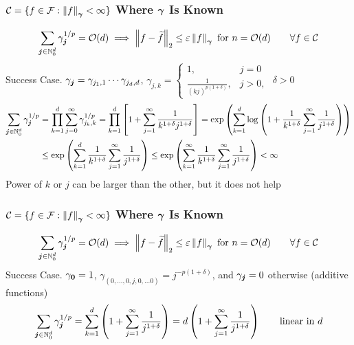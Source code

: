 \documentclass[11pt,compress,xcolor={usenames,dvipsnames},aspectratio=169]{beamer}
\begin{document}
\begin{frame}
\frametitle{$\cc = \{f \in \cf : \norm[\vgamma]{f} < \infty \}$ Where $\vgamma$ Is Known}
\vspace{-6ex}
\begin{equation*}
\sum_{\vj \in \natzero^d} \gamma_{\vj}^{1/p} = \Order(d) \implies \norm[2]{f - \tf}  \le \varepsilon \norm[\vgamma]{f} \text{ for } n = \Order(d) \qquad \forall f \in \cc
\end{equation*}
\alert{Success} Case.  $\gamma_{\vj} = \gamma_{j_1,1} \cdots \gamma_{j_d,d}$,  \quad $\gamma_{j,k} = \begin{cases}
1, & j = 0 \\
\frac{1}{(kj)^{p(1+\delta)}} , & j > 0,
\end{cases}$ \quad $\delta > 0$
\begin{align*}
\sum_{\vj \in \natzero^d} \gamma_{\vj}^{1/p} 
&= \prod_{k=1}^d \sum_{j = 0}^{\infty} \gamma_{j_k,k}^{1/p}
= \prod_{k=1}^d \left[1 + \sum_{j = 1}^{\infty} \frac{1}{k^{1+\delta}j^{1+\delta}} \right]
= \exp\left(\sum_{k=1}^d \log \left( 1 + \frac 1{k^{1+\delta}} \sum_{j=1}^\infty \frac1{j^{1+\delta}}\right) \right) \\
& \le \exp\left(\sum_{k=1}^d  \frac 1{k^{1+\delta}} \sum_{j=1}^\infty \frac1{j^{1+\delta}}\right) \le \exp\left(\sum_{k=1}^\infty \frac 1{k^{1+\delta}} \sum_{j=1}^\infty \frac1{j^{1+\delta}}\right) < \infty
\end{align*}
Power of $k$ or $j$ can be larger than the other, but it does not help
\end{frame}

\begin{frame}
\frametitle{$\cc = \{f \in \cf : \norm[\vgamma]{f} < \infty \}$ Where $\vgamma$ Is Known}
\vspace{-6ex}
\begin{equation*}
\sum_{\vj \in \natzero^d} \gamma_{\vj}^{1/p} = \Order(d) \implies \norm[2]{f - \tf}  \le \varepsilon \norm[\vgamma]{f} \text{ for } n = \Order(d) \qquad \forall f \in \cc
\end{equation*}
\alert{Success} Case.  $\gamma_{\vzero} = 1$, $\gamma_{(0,\ldots, 0, j, 0, \ldots 0)} = j^{-p(1+\delta)}$, and $\gamma_{\vj} = 0$ otherwise (additive functions)
\begin{equation*}
\sum_{\vj \in \natzero^d} \gamma_{\vj}^{1/p} 
= \sum_{k=1}^d \left(1+ \sum_{j = 1}^{\infty} \frac{1}{j^{1+\delta}} \right) = d \left(1+ \sum_{j = 1}^{\infty} \frac{1}{j^{1+\delta}} \right) \qquad \text{linear in } d
\end{equation*}
\end{frame}
\end{document}
